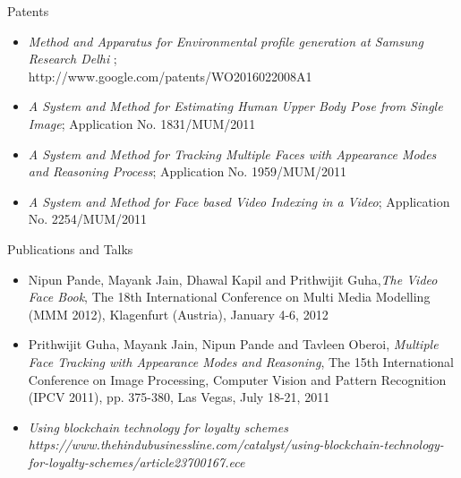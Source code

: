 \documentclass{resume} %
\begin{document}

\begin{rSection}{Patents}

\begin{itemize}
\item \textit{Method and Apparatus for Environmental profile generation at Samsung Research Delhi };\\ http://www.google.com/patents/WO2016022008A1
\item \textit{A System and Method for Estimating Human Upper Body Pose from Single Image};  Application No. 1831/MUM/2011
\item \textit{A System and Method for Tracking Multiple Faces with Appearance Modes and Reasoning Process}; Application No. 1959/MUM/2011
\item \textit{A System and Method for Face based Video Indexing in a Video}; Application No. 2254/MUM/2011
\end{itemize}


\end{rSection}

\begin{rSection}{Publications and Talks}

\begin{itemize}


\item Nipun Pande, Mayank Jain, Dhawal Kapil and Prithwijit Guha,\emph{The Video Face Book}, The 18th International Conference on Multi Media Modelling (MMM 2012), Klagenfurt (Austria), January 4-6, 2012 
\item Prithwijit Guha, Mayank Jain, Nipun Pande and Tavleen Oberoi, \emph{Multiple Face Tracking with Appearance Modes and Reasoning}, The 15th International Conference on Image Processing, Computer Vision and Pattern Recognition (IPCV 2011), pp. 375-380, Las Vegas, July 18-21, 2011
\item \emph{Using blockchain technology for loyalty schemes} \\ 
\textit{https://www.thehindubusinessline.com/catalyst/using-blockchain-technology-for-loyalty-schemes/article23700167.ece}

\end{itemize}

\end{rSection}
\end{document}
